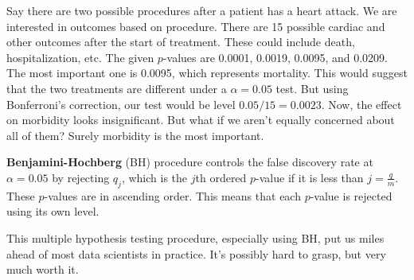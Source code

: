 \documentclass[titlepage, 12pt, leqno]{article}
\begin{document}
Say there are two possible procedures after a patient has a heart attack. We
are interested in outcomes based on procedure. There are 15 possible cardiac
and other outcomes after the start of treatment. These could include death,
hospitalization, etc. The given $p$-values are 0.0001, 0.0019, 0.0095, and
0.0209. The most important one is 0.0095, which represents mortality. This would
suggest that the two treatments are different under a $\alpha=0.05$ test. But
using Bonferroni's correction, our test would be level $0.05/15 = 0.0023$. Now,
the effect on morbidity looks insignificant. But what if we aren't equally
concerned about all of them? Surely morbidity is the most important.

\begin{definition}
    \textbf{Benjamini-Hochberg} (BH) procedure controls the false discovery
    rate at $\alpha = 0.05$ by rejecting $q_{j}$, which is the $j$th ordered
    $p$-value if it is less than $j = \frac{q}{m}$. These $p$-values are in
    ascending order. This means that each $p$-value is rejected using its
    own level.
\end{definition}

\begin{note}
    This multiple hypothesis testing procedure, especially using BH, put us
    miles ahead of most data scientists in practice. It's possibly hard to 
    grasp, but very much worth it.
\end{note}
\end{document}
